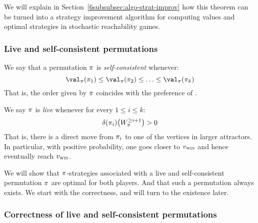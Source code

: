 We will explain in Section~\ref{6subsubsec:algo-strat-improv} how this
theorem can be turned into a strategy improvement algorithm for
computing values and optimal strategies in stochastic reachability
games.



\subsubsection{Live and self-consistent permutations}


We say that a permutation $\pi$ is \emph{self-consistent} whenever:
\[
\val_\perm(\perm_1) \le \val_\perm(\perm_2) \le \ldots \le \val_\perm(\perm_k)
\]
That is, the order given by $\pi$ coincides with the preference of
\Eve.

We say $\pi$ is \emph{live} whenever for every $1 \le i \le k$:
\[
\delta(\pi_i)\big(W_\pi^{\ge i+1}\big)>0
\]
That is, there is a direct move from $\pi_i$ to one of the vertices
in larger attractors. In particular, with positive probability, one
goes closer to $v_{\textsc{win}}$ and hence eventually reach $v_{\textsc{win}}$.

\medskip We will show that $\pi$-strategies associated with a live
and self-consistent permutation $\pi$ are optimal for both players.
And that such a permutation always exists. We start with the
correctness, and will turn to the existence later.


\subsubsection{Correctness of live and self-consistent permutations}


